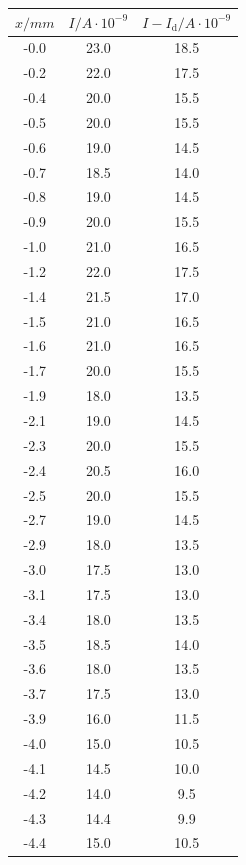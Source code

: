 \begin{table}
\begin{minipage}{0.46\textwidth}
    \centering
	\begin{tabular}{c|c|c}
		\toprule
		{$x / mm$} & {$I / A\cdot10^{-9}$} & {$I - I_\text{d} / A\cdot10^{-9}$}\\
		\hline
        \midrule
        -0.0 &23.0&18.5\\
        -0.2 &22.0&17.5\\
        -0.4 &20.0&15.5\\
        -0.5 &20.0&15.5\\
        -0.6 &19.0&14.5\\
        -0.7 &18.5&14.0\\
        -0.8 &19.0&14.5\\
        -0.9 &20.0&15.5\\
        -1.0 &21.0&16.5\\
        -1.2 &22.0&17.5\\
        -1.4 &21.5&17.0\\
        -1.5 &21.0&16.5\\
        -1.6 &21.0&16.5\\
        -1.7 &20.0&15.5\\
        -1.9 &18.0&13.5\\
        -2.1 &19.0&14.5\\
        -2.3 &20.0&15.5\\
        -2.4 &20.5&16.0\\
        -2.5 &20.0&15.5\\
        -2.7 &19.0&14.5\\
        -2.9 &18.0&13.5\\
        -3.0 &17.5&13.0\\
        -3.1 &17.5&13.0\\
        -3.4 &18.0&13.5\\
        -3.5 &18.5&14.0\\
        -3.6 &18.0&13.5\\
        -3.7 &17.5&13.0\\
        -3.9 &16.0&11.5\\
        -4.0 &15.0&10.5\\
        -4.1 &14.5&10.0\\
        -4.2 &14.0&9.5\\
        -4.3 &14.4&9.9\\
        -4.4 &15.0&10.5\\
		\bottomrule 
	\end{tabular}
\end{minipage}
\end{table}
